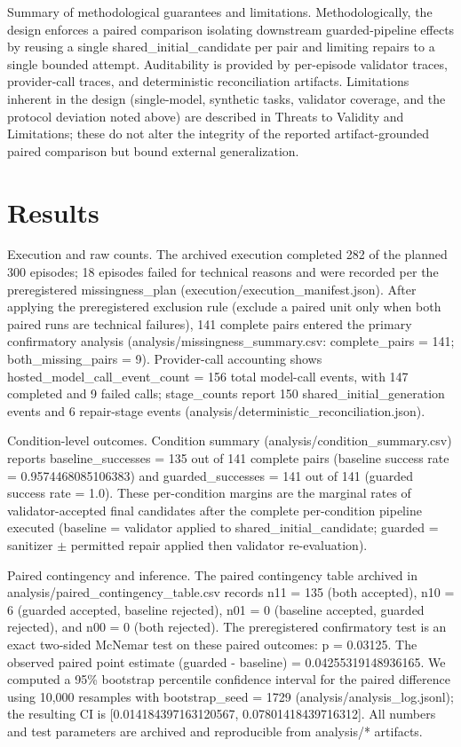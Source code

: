 \documentclass[conference]{IEEEtran}
\begin{document}
Summary of methodological guarantees and limitations. Methodologically, the design enforces a paired comparison isolating downstream guarded-pipeline effects by reusing a single shared\_initial\_candidate per pair and limiting repairs to a single bounded attempt. Auditability is provided by per-episode validator traces, provider-call traces, and deterministic reconciliation artifacts. Limitations inherent in the design (single-model, synthetic tasks, validator coverage, and the protocol deviation noted above) are described in Threats to Validity and Limitations; these do not alter the integrity of the reported artifact-grounded paired comparison but bound external generalization.

\section{Results}
Execution and raw counts. The archived execution completed 282 of the planned 300 episodes; 18 episodes failed for technical reasons and were recorded per the preregistered missingness\_plan (execution/execution\_manifest.json). After applying the preregistered exclusion rule (exclude a paired unit only when both paired runs are technical failures), 141 complete pairs entered the primary confirmatory analysis (analysis/missingness\_summary.csv: complete\_pairs = 141; both\_missing\_pairs = 9). Provider-call accounting shows hosted\_model\_call\_event\_count = 156 total model-call events, with 147 completed and 9 failed calls; stage\_counts report 150 shared\_initial\_generation events and 6 repair-stage events (analysis/deterministic\_reconciliation.json).

Condition-level outcomes. Condition summary (analysis/condition\_summary.csv) reports baseline\_successes = 135 out of 141 complete pairs (baseline success rate = 0.9574468085106383) and guarded\_successes = 141 out of 141 (guarded success rate = 1.0). These per-condition margins are the marginal rates of validator-accepted final candidates after the complete per-condition pipeline executed (baseline = validator applied to shared\_initial\_candidate; guarded = sanitizer \ensuremath{\pm} permitted repair applied then validator re-evaluation).

Paired contingency and inference. The paired contingency table archived in analysis/paired\_contingency\_table.csv records n11 = 135 (both accepted), n10 = 6 (guarded accepted, baseline rejected), n01 = 0 (baseline accepted, guarded rejected), and n00 = 0 (both rejected). The preregistered confirmatory test is an exact two-sided McNemar test on these paired outcomes: p = 0.03125. The observed paired point estimate (guarded - baseline) = 0.04255319148936165. We computed a 95\% bootstrap percentile confidence interval for the paired difference using 10,000 resamples with bootstrap\_seed = 1729 (analysis/analysis\_log.jsonl); the resulting CI is [0.014184397163120567, 0.07801418439716312]. All numbers and test parameters are archived and reproducible from analysis/* artifacts.
\end{document}
